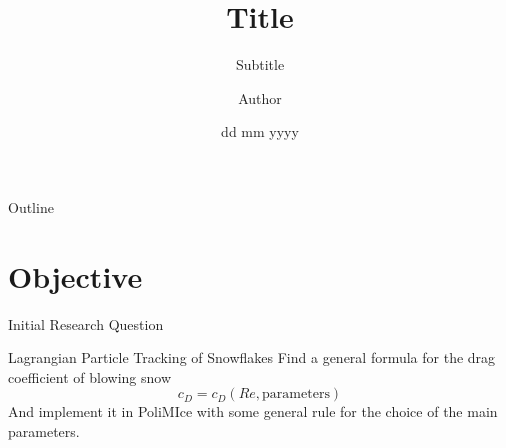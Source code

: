\documentclass{beamer}
\title{Title}
\subtitle{Subtitle}
\author{Author}
\date{dd mm yyyy}
\begin{document}
    \begin{frame}
        \maketitle
    \end{frame}
    
    \begin{frame}{Outline}
      \tableofcontents
    \end{frame}
    
\section{Objective}
    \begin{frame}[plain]{}
        \sectionpage
    \end{frame}
    
    \begin{frame}{Initial Research Question}
        \begin{block}{Lagrangian Particle Tracking of Snowflakes}
        	Find a general formula for the drag coefficient of blowing snow
        	\begin{equation*}
        		c_D = c_D (Re, \text{parameters})
        	\end{equation*}
        	And implement it in PoliMIce with some general rule for the choice of the main parameters.
        \end{block}
    \end{frame}
    
\end{document}

